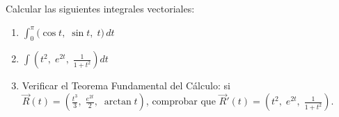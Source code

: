 Calcular las siguientes integrales vectoriales:
\begin{enumerate}
    \item $\displaystyle\int_0^{\pi} \bigl(\cos t,\; \sin t,\; t\bigr)\, dt$
    \item $\displaystyle\int \left(t^2,\; e^{2t},\; \frac{1}{1+t^2}\right) dt$
    \item Verificar el Teorema Fundamental del Cálculo: si $\vec{R}(t) = \left(\frac{t^3}{3},\; \frac{e^{2t}}{2},\; \arctan t\right)$, comprobar que $\vec{R}'(t) = \left(t^2,\; e^{2t},\; \frac{1}{1+t^2}\right)$.
\end{enumerate}